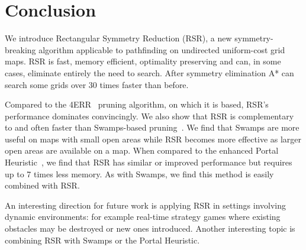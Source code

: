 \section{Conclusion}
We introduce Rectangular Symmetry Reduction (RSR), a new symmetry-breaking algorithm
applicable to pathfinding on undirected uniform-cost grid maps. RSR is fast,
memory efficient, optimality preserving and can, in some cases, eliminate
entirely the need to search.  After symmetry elimination A* can
search some grids over 30 times faster than before.
\par
Compared to the 4ERR~\cite{harabor10} pruning algorithm, on which it is based,
RSR's performance dominates convincingly.
We also show that RSR is complementary to and often faster than Swamps-based
pruning~\cite{pochter10}.
We find that Swamps are more useful on maps with small open areas
while RSR becomes more effective as larger open areas are available on a map. 
When compared to the enhanced Portal Heuristic~\cite{goldenberg10}, we find that 
RSR has similar or improved performance but requires up to 7 times less memory.
As with Swamps, we find this method is easily combined with RSR.
\par
An interesting direction for future work is applying RSR in settings involving 
dynamic environments: for example real-time strategy games where existing obstacles 
may be destroyed or new ones introduced.
Another interesting topic is combining RSR with Swamps or the Portal Heuristic.
